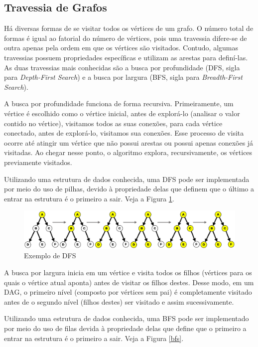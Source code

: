     \subsection[Travessia de Grafos]{Travessia de Grafos}

      Há diversas formas de se visitar todos os vértices de um grafo. O número total de formas é igual ao fatorial do número de vértices, pois uma travessia difere-se de outra apenas pela ordem em que os vértices são visitados. Contudo, algumas travessias possuem propriedades específicas e utilizam as arestas para definí-las. As duas travessias mais conhecidas são a busca por profundidade (DFS, sigla para \textit{Depth-First Search}) e a busca por largura (BFS, sigla para \textit{Breadth-First Search}).

      A busca por profundidade funciona de forma recursiva. Primeiramente, um vértice é escolhido como o vértice inicial, antes de explorá-lo (analisar o valor contido no vértice), visitamos todos as suas conexões, para cada vértice conectado, antes de explorá-lo, visitamos sua conexões. Esse processo de visita ocorre até atingir um vértice que não possui arestas ou possui apenas conexões já visitadas. Ao chegar nesse ponto, o algoritmo explora, recursivamente, os vértices previamente visitados.

      Utilizando uma estrutura de dados conhecida, uma DFS pode ser implementada por meio do uso de pilhas, devido à propriedade delas que definem que o último a entrar na estrutura é o primeiro a sair. Veja a Figura \ref{dfs}.

      \begin{figure}[htb]
        \centering
        \includegraphics[scale=0.2]{figuras/dfs.eps}
        \caption{Exemplo de DFS}
        \label{dfs}
      \end{figure}


      A busca por largura inicia em um vértice e visita todos os filhos (vértices para os quais o vértice atual aponta) antes de visitar os filhos destes. Desse modo, em um DAG, o primeiro nível (composto por vértices sem pai) é completamente visitado antes de o segundo nível (filhos destes) ser visitado e assim sucessivamente.

      Utilizando uma estrutura de dados conhecida, uma BFS pode ser implementado por meio do uso de filas devida à propriedade delas que define que o primeiro a entrar na estrutura é o primeiro a sair. Veja a Figura \ref{bfs}.

